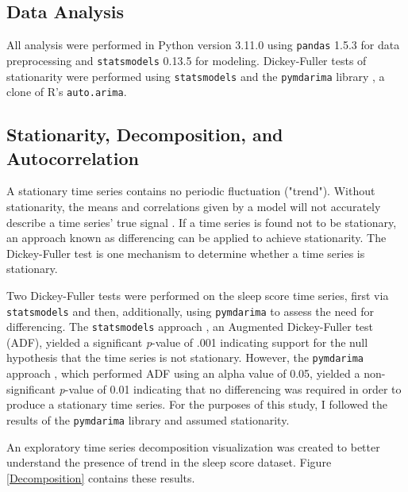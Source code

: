 \documentclass{article}
\begin{document}
\hypertarget{data-analysis}{%
\subsection{Data Analysis}\label{data-analysis}}

All analysis were performed in Python version 3.11.0 \citep{Python} using
\texttt{pandas} 1.5.3 \citep{reback2020pandas} for data preprocessing and
\texttt{statsmodels} 0.13.5 \citep{seabold2010statsmodels} for modeling.
Dickey-Fuller tests of stationarity were performed using \texttt{statsmodels}
and the \texttt{pymdarima} library \citep{pmdarima}, a clone of R's
\texttt{auto.arima}.

\hypertarget{stationarity-decomposition-and-autocorrelation}{%
\subsection{Stationarity, Decomposition, and
Autocorrelation}\label{stationarity-decomposition-and-autocorrelation}}

A stationary time series contains no periodic fluctuation ("trend"). Without
stationarity, the means and correlations given by a model will not accurately
describe a time series' true signal \citep{boseVector2017}. If a time series is
found not to be stationary, an approach known as differencing can be applied to
achieve stationarity. The Dickey-Fuller test is one mechanism to determine
whether a time series is stationary.

Two Dickey-Fuller tests were performed on the sleep score time series, first via
\texttt{statsmodels} and then, additionally, using \texttt{pymdarima} to assess
the need for differencing. The \texttt{statsmodels} approach
\citet{seabold2020statsmodels}, an Augmented Dickey-Fuller test (ADF), yielded a
significant \textit{p}-value of .001 indicating support for the null hypothesis
that the time series is not stationary. However, the \texttt{pymdarima} approach
\citet{pymdarima}, which performed ADF using an alpha value of 0.05, yielded a
non-significant \textit{p}-value of 0.01 indicating that no differencing was
required in order to produce a stationary time series. For the purposes of this
study, I followed the results of the \texttt{pymdarima} library and assumed
stationarity.

An exploratory time series decomposition visualization was created to better
understand the presence of trend in the sleep score dataset. Figure
\ref{Decomposition} contains these results.
\end{document}
